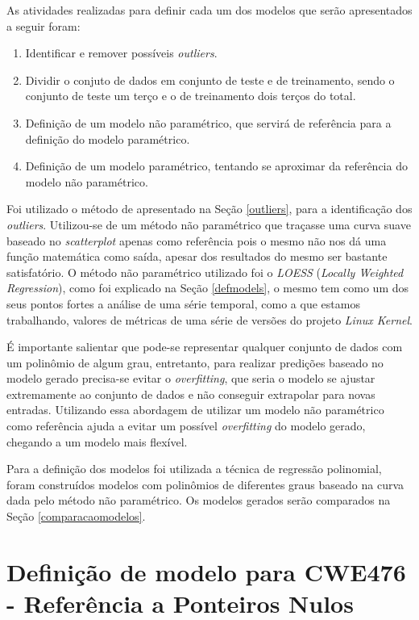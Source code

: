 As atividades realizadas para definir cada um dos modelos que serão apresentados a
seguir foram:

\begin{enumerate}
 \item Identificar e remover possíveis \textit{outliers}.
 \item Dividir o conjuto de dados em conjunto de teste e de treinamento, sendo o
  conjunto de teste um terço e o de treinamento dois terços do total.
 \item Definição de um modelo não paramétrico, que servirá de referência para a
  definição do modelo paramétrico.
 \item Definição de um modelo paramétrico, tentando se aproximar da referência
  do modelo não paramétrico.
\end{enumerate}

Foi utilizado o método de  apresentado na Seção
\ref{outliers}, para a identificação dos \textit{outliers}. Utilizou-se de um
método não paramétrico que traçasse uma curva suave baseado no
\textit{scatterplot} apenas como referência pois o mesmo não nos dá uma função
matemática como saída, apesar dos resultados do mesmo ser bastante satisfatório.
O método não paramétrico utilizado foi o \textit{LOESS} (\textit{Locally
 Weighted Regression}), como foi explicado na Seção \ref{defmodels}, o mesmo tem
 como um dos seus pontos fortes a análise de uma série temporal, como a que
 estamos trabalhando, valores de métricas de uma série de versões do projeto
 \textit{Linux Kernel}.
 
 É importante salientar que pode-se representar qualquer conjunto de dados com
 um polinômio de algum grau, entretanto, para realizar predições baseado no
 modelo gerado precisa-se evitar o \textit{overfitting}, que seria o modelo se
 ajustar extremamente ao conjunto de dados e não conseguir extrapolar para novas
 entradas. Utilizando essa abordagem de utilizar um modelo não paramétrico como
 referência ajuda a evitar um possível \textit{overfitting} do modelo gerado,
 chegando a um modelo mais flexível.

Para a definição dos modelos foi utilizada a técnica de regressão polinomial,
foram construídos modelos com polinômios de diferentes graus baseado na curva
dada pelo método não paramétrico. Os modelos gerados serão comparados na Seção
\ref{comparacaomodelos}.

\section{Definição de modelo para CWE476 - Referência a Ponteiros Nulos}

